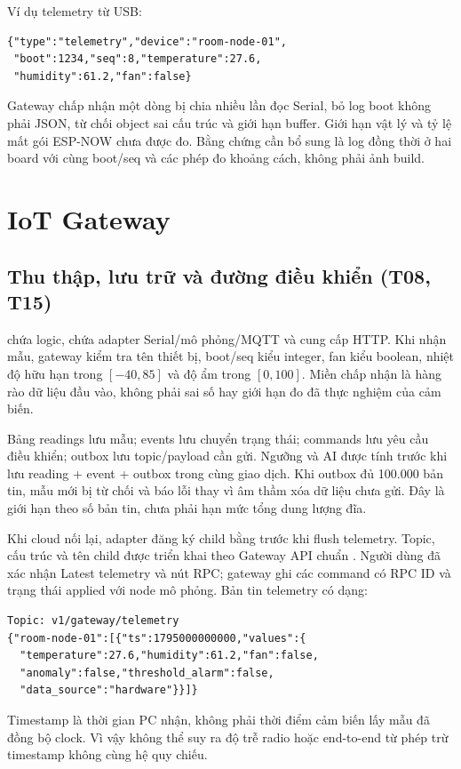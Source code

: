 Ví dụ telemetry từ USB:
\begin{verbatim}
{"type":"telemetry","device":"room-node-01",
 "boot":1234,"seq":8,"temperature":27.6,
 "humidity":61.2,"fan":false}
\end{verbatim}
Gateway chấp nhận một dòng bị chia nhiều lần đọc Serial, bỏ log boot không phải JSON, từ chối object sai cấu trúc và giới hạn buffer. Giới hạn vật lý và tỷ lệ mất gói ESP-NOW chưa được đo. Bằng chứng cần bổ sung là log đồng thời ở hai board với cùng boot/seq và các phép đo khoảng cách, không phải ảnh build.

\section{IoT Gateway}
\subsection{Thu thập, lưu trữ và đường điều khiển (T08, T15)}
 chứa logic,  chứa adapter Serial/mô phỏng/MQTT và  cung cấp HTTP. Khi nhận mẫu, gateway kiểm tra tên thiết bị, boot/seq kiểu integer, fan kiểu boolean, nhiệt độ hữu hạn trong $[-40,85]$ và độ ẩm trong $[0,100]$. Miền chấp nhận là hàng rào dữ liệu đầu vào, không phải sai số hay giới hạn đo đã thực nghiệm của cảm biến.

Bảng readings lưu mẫu; events lưu chuyển trạng thái; commands lưu yêu cầu điều khiển; outbox lưu topic/payload cần gửi. Ngưỡng và AI được tính trước khi lưu reading + event + outbox trong cùng giao dịch. Khi outbox đủ 100.000 bản tin, mẫu mới bị từ chối và báo lỗi thay vì âm thầm xóa dữ liệu chưa gửi. Đây là giới hạn theo số bản tin, chưa phải hạn mức tổng dung lượng đĩa.

Khi cloud nối lại, adapter đăng ký child bằng  trước khi flush telemetry. Topic, cấu trúc và tên child được triển khai theo Gateway API chuẩn \cite{gatewayapi}. Người dùng đã xác nhận Latest telemetry và nút RPC; gateway ghi các command có RPC ID và trạng thái applied với node mô phỏng. Bản tin telemetry có dạng:
\begin{verbatim}
Topic: v1/gateway/telemetry
{"room-node-01":[{"ts":1795000000000,"values":{
  "temperature":27.6,"humidity":61.2,"fan":false,
  "anomaly":false,"threshold_alarm":false,
  "data_source":"hardware"}}]}
\end{verbatim}
Timestamp là thời gian PC nhận, không phải thời điểm cảm biến lấy mẫu đã đồng bộ clock. Vì vậy không thể suy ra độ trễ radio hoặc end-to-end từ phép trừ timestamp không cùng hệ quy chiếu.


